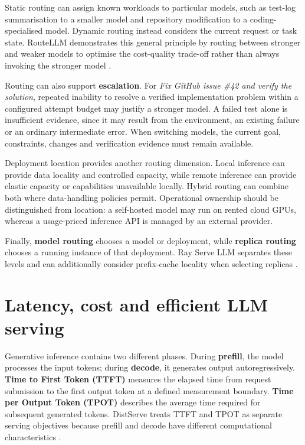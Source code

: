Static routing can assign known workloads to particular models, such as test-log summarisation to a smaller model and repository modification to a coding-specialised model. Dynamic routing instead considers the current request or task state. RouteLLM demonstrates this general principle by routing between stronger and weaker models to optimise the cost-quality trade-off rather than always invoking the stronger model \parencite{ong2024routellm}.

Routing can also support \textbf{escalation}. For \emph{Fix GitHub issue \#42 and verify the solution}, repeated inability to resolve a verified implementation problem within a configured attempt budget may justify a stronger model. A failed test alone is insufficient evidence, since it may result from the environment, an existing failure or an ordinary intermediate error. When switching models, the current goal, constraints, changes and verification evidence must remain available.

Deployment location provides another routing dimension. Local inference can provide data locality and controlled capacity, while remote inference can provide elastic capacity or capabilities unavailable locally. Hybrid routing can combine both where data-handling policies permit. Operational ownership should be distinguished from location: a self-hosted model may run on rented cloud GPUs, whereas a usage-priced inference API is managed by an external provider.

Finally, \textbf{model routing} chooses a model or deployment, while \textbf{replica routing} chooses a running instance of that deployment. Ray Serve LLM separates these levels and can additionally consider prefix-cache locality when selecting replicas \parencite{ray-routing}.

\section{Latency, cost and efficient LLM serving}

Generative inference contains two different phases. During \textbf{prefill}, the model processes the input tokens; during \textbf{decode}, it generates output autoregressively. \textbf{Time to First Token (TTFT)} measures the elapsed time from request submission to the first output token at a defined measurement boundary. \textbf{Time per Output Token (TPOT)} describes the average time required for subsequent generated tokens. DistServe treats TTFT and TPOT as separate serving objectives because prefill and decode have different computational characteristics \parencite{zhong2024distserve}.

